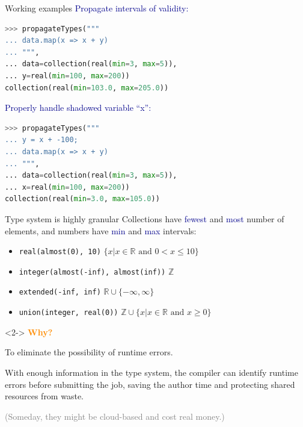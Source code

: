 \documentclass{beamer}
\begin{document}
\begin{frame}[fragile]{Working examples}
\vspace{0.3 cm}
\textcolor{darkblue}{Propagate intervals of validity:}
\begin{lstlisting}[language=python]
>>> propagateTypes("""
... data.map(x => x + y)
... """,
... data=collection(real(min=3, max=5)),
... y=real(min=100, max=200))
collection(real(min=103.0, max=205.0))
\end{lstlisting}

\vfill
\textcolor{darkblue}{Properly handle shadowed variable ``x'':}
\begin{lstlisting}[language=python]
>>> propagateTypes("""
... y = x + -100;
... data.map(x => x + y)
... """,
... data=collection(real(min=3, max=5)),
... x=real(min=100, max=200))
collection(real(min=3.0, max=105.0))
\end{lstlisting}
\end{frame}

\begin{frame}{Type system is highly granular}
\vspace{0.5 cm}
Collections have \textcolor{darkblue}{fewest} and \textcolor{darkblue}{most} number of elements, and numbers have \textcolor{darkblue}{min} and \textcolor{darkblue}{max} intervals:
\begin{itemize}
\item {\tt\small real(almost(0), 10)} \hfill $\{x | x \in \mathbb{R}\mbox{ and } 0 < x \le 10\}$
\item {\tt\small integer(almost(-inf), almost(inf))} \hfill $\mathbb{Z}$
\item {\tt\small extended(-inf, inf)} \hfill $\mathbb{R} \cup \{-\infty, \infty\}$
\item {\tt\small union(integer, real(0))} \hfill $\mathbb{Z} \cup \{x | x \in \mathbb{R}\mbox{ and } x \ge 0\}$
\end{itemize}

\vfill
\begin{uncoverenv}<2->
\textcolor{darkorange}{\bf Why?}

\vspace{0.2 cm}
To eliminate the possibility of runtime errors.

\vspace{0.2 cm}
With enough information in the type system, the compiler can identify runtime errors before submitting the job, saving the author time and protecting shared resources from waste.

\vspace{0.2 cm}
\textcolor{gray}{(Someday, they might be cloud-based and cost real money.)}
\end{uncoverenv}
\end{frame}
\end{document}
